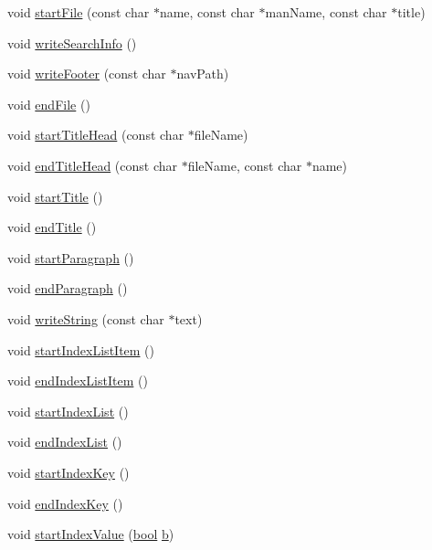\begin{DoxyCompactItemize}
\item 
void \hyperlink{class_output_list_a9254223c5951e1202a5bd131a8f1efb2}{start\+File} (const char $\ast$name, const char $\ast$man\+Name, const char $\ast$title)
\item 
void \hyperlink{class_output_list_a0b776a7ac371d841b15862b074ddd97f}{write\+Search\+Info} ()
\item 
void \hyperlink{class_output_list_a97a0ce24de0f13c745f9ce81fd935509}{write\+Footer} (const char $\ast$nav\+Path)
\item 
void \hyperlink{class_output_list_a5b0f833d3150110151ae6a095a8549a5}{end\+File} ()
\item 
void \hyperlink{class_output_list_afa545f07e33be5cc67d214fea88bdee8}{start\+Title\+Head} (const char $\ast$file\+Name)
\item 
void \hyperlink{class_output_list_a77a0df4075d36362e3944f2f7fc358b8}{end\+Title\+Head} (const char $\ast$file\+Name, const char $\ast$name)
\item 
void \hyperlink{class_output_list_a0edaede07adae2149d715105433848c9}{start\+Title} ()
\item 
void \hyperlink{class_output_list_a6b1d6b4e89edaebfe3291b24505e80c5}{end\+Title} ()
\item 
void \hyperlink{class_output_list_ad6c1fc2a1b67c59c1efb27fb59aa7e5f}{start\+Paragraph} ()
\item 
void \hyperlink{class_output_list_a6523eb013a6f759d505650de41855085}{end\+Paragraph} ()
\item 
void \hyperlink{class_output_list_adeaf5f7b41eca22a3afbc415a8390767}{write\+String} (const char $\ast$text)
\item 
void \hyperlink{class_output_list_adf2df33c38b53c9b95fe003aed5bc222}{start\+Index\+List\+Item} ()
\item 
void \hyperlink{class_output_list_aac70ec48d9f50b625f757a02a7758712}{end\+Index\+List\+Item} ()
\item 
void \hyperlink{class_output_list_ace955285a164c7f27f0923986a36cff5}{start\+Index\+List} ()
\item 
void \hyperlink{class_output_list_a5577c7f73e2b8925ba8aedad6c5d1cc9}{end\+Index\+List} ()
\item 
void \hyperlink{class_output_list_a193f96c7af956fe9443ffc099fc5cc13}{start\+Index\+Key} ()
\item 
void \hyperlink{class_output_list_a68031752ec7526128f5c77b7e18e932e}{end\+Index\+Key} ()
\item 
void \hyperlink{class_output_list_a9ffa966ddc43f8d39e5a1e74a814ebef}{start\+Index\+Value} (\hyperlink{qglobal_8h_a1062901a7428fdd9c7f180f5e01ea056}{bool} \hyperlink{060__command__switch_8tcl_a68bdb74c144118d936931c46f75d4b3e}{b})

\end{DoxyCompactItemize}
